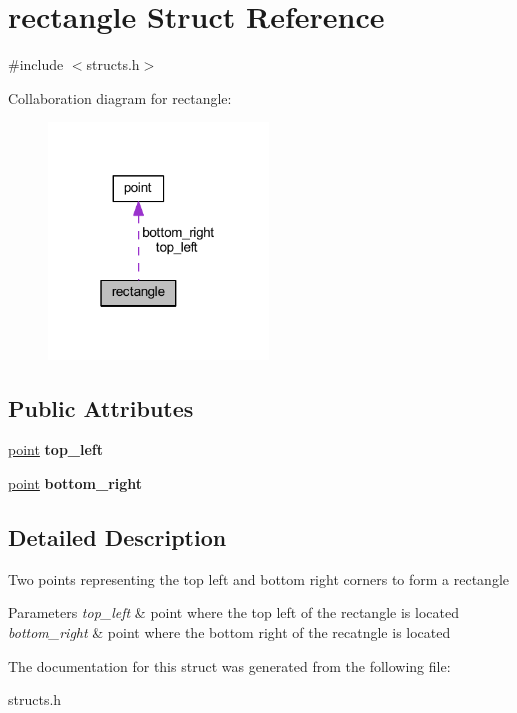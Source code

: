 \hypertarget{structrectangle}{}\section{rectangle Struct Reference}
\label{structrectangle}


{\ttfamily \#include $<$structs.\+h$>$}



Collaboration diagram for rectangle\+:\nopagebreak
\begin{figure}[H]
\begin{center}
\leavevmode
\includegraphics[width=166pt]{structrectangle__coll__graph}
\end{center}
\end{figure}
\subsection*{Public Attributes}
\begin{DoxyCompactItemize}
\item 
\mbox{\label{structrectangle_a728703fcf5a71a4e1b156cfc6f4504e0}} 
\mbox{\hyperlink{structpoint}{point}} {\bfseries top\+\_\+left}
\item 
\mbox{\label{structrectangle_a6920a2662992d3f86825dbcbe8264659}} 
\mbox{\hyperlink{structpoint}{point}} {\bfseries bottom\+\_\+right}
\end{DoxyCompactItemize}


\subsection{Detailed Description}
Two points representing the top left and bottom right corners to form a rectangle 
\begin{DoxyParams}{Parameters}
{\em top\+\_\+left} & point where the top left of the rectangle is located \\
\hline
{\em bottom\+\_\+right} & point where the bottom right of the recatngle is located \\
\hline
\end{DoxyParams}


The documentation for this struct was generated from the following file\+:\begin{DoxyCompactItemize}
\item 
structs.\+h\end{DoxyCompactItemize}
